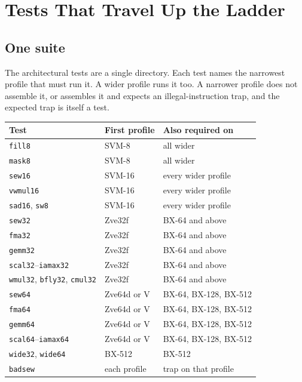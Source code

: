 \chapter{Tests That Travel Up the Ladder}
\label{ch:tests}

\section{One suite}

The architectural tests are a single directory. Each test names the narrowest profile that must run it. A wider profile runs it too. A narrower profile does not assemble it, or assembles it and expects an illegal-instruction trap, and the expected trap is itself a test.

\begin{center}
\begin{tabular}{@{}llp{5.8cm}@{}}
\toprule
Test & First profile & Also required on \\
\midrule
\texttt{fill8} & SVM-8 & all wider \\
\texttt{mask8} & SVM-8 & all wider \\
\texttt{sew16} & SVM-16 & every wider profile \\
\texttt{vwmul16} & SVM-16 & every wider profile \\
\texttt{sad16}, \texttt{sw8} & SVM-16 & every wider profile \\
\texttt{sew32} & Zve32f & BX-64 and above \\
\texttt{fma32} & Zve32f & BX-64 and above \\
\texttt{gemm32} & Zve32f & BX-64 and above \\
\texttt{scal32}--\texttt{iamax32} & Zve32f & BX-64 and above \\
\texttt{wmul32}, \texttt{bfly32}, \texttt{cmul32} & Zve32f & BX-64 and above \\
\texttt{sew64} & Zve64d or V & BX-64, BX-128, BX-512 \\
\texttt{fma64} & Zve64d or V & BX-64, BX-128, BX-512 \\
\texttt{gemm64} & Zve64d or V & BX-64, BX-128, BX-512 \\
\texttt{scal64}--\texttt{iamax64} & Zve64d or V & BX-64, BX-128, BX-512 \\
\texttt{wide32}, \texttt{wide64} & BX-512 & BX-512 \\
\texttt{badsew} & each profile & trap on that profile \\
\bottomrule
\end{tabular}
\end{center}

